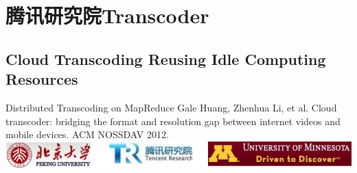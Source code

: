 \documentclass{beamer}
\begin{document}
\section{腾讯研究院Transcoder}
\subsection{Cloud Transcoding Reusing Idle Computing Resources}
\begin{frame}{Distributed Transcoding on MapReduce}
Gale Huang, Zhenhua Li, et al. Cloud transcoder: bridging the format and resolution gap between internet videos and mobile devices. ACM NOSSDAV 2012. 
\textbf{\includegraphics[scale=0.40]{fig/cloud_transcoder_nossdav_affiliation.png}}



\end{frame}
\end{document}
